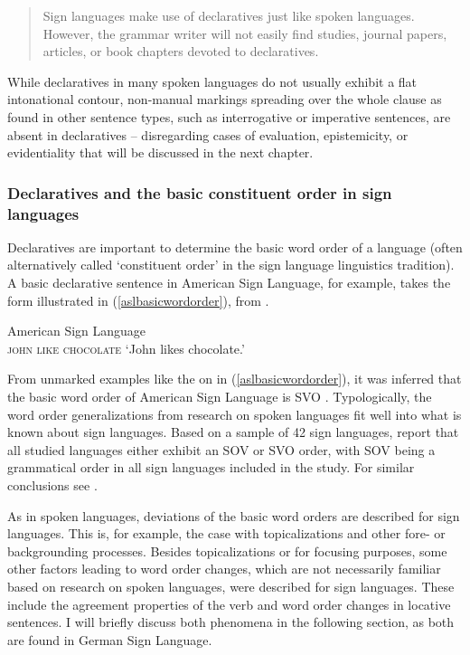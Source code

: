\begin{quote}
Sign languages make use of declaratives just like spoken languages. However, the grammar writer will not easily find studies, journal papers, articles, or book chapters devoted to declaratives.
\end{quote}

\noindent While declaratives in many spoken languages do not usually exhibit a flat intonational contour, non-manual markings spreading over the whole clause as found in other sentence types, such as interrogative or imperative sentences, are absent in declaratives -- disregarding cases of evaluation, epistemicity, or evidentiality that will be discussed in the next chapter.

\subsubsection{Declaratives and the basic constituent order in sign languages}
Declaratives are important to determine the basic word order of a language (often alternatively called `constituent order' in the sign language linguistics tradition). A basic declarative sentence in American Sign Language, for example, takes the form illustrated in (\ref{aslbasicwordorder}), from \citet[81]{neidle2000syntax}. 

\begin{exe}
\ex American Sign Language\\
\textsc{john like chocolate} 
\glt `John likes chocolate.'\label{aslbasicwordorder}
\end{exe} 

\noindent From unmarked examples like the on in (\ref{aslbasicwordorder}), it was inferred that the basic word order of American Sign Language is SVO \citep{fischer1975influences}. Typologically, the word order generalizations from research on spoken languages fit well into what is known about sign languages. Based on a sample of 42 sign languages, \citet{napoli2014order} report that all studied languages either exhibit an SOV or SVO order, with SOV being a grammatical order in all sign languages included in the study. For similar conclusions see \citet{kimmelman2012word}.

As in spoken languages, deviations of the basic word orders are described for sign languages. This is, for example, the case with topicalizations and other fore- or backgrounding processes. Besides topicalizations or for focusing purposes, some other factors leading to word order changes, which are not necessarily familiar based on research on spoken languages, were described for sign languages. These include the agreement properties of the verb and word order changes in locative sentences. I will briefly discuss both phenomena in the following section, as both are found in German Sign Language.

